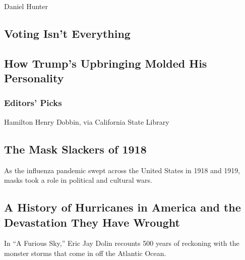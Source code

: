 \href{/2020/08/04/opinion/voting-2020-election-blm-movement.html}{}

Daniel Hunter

\hypertarget{voting-isnt-everything}{%
\subsection{Voting Isn't Everything}\label{voting-isnt-everything}}

\href{/2020/08/04/opinion/letters/trump-family.html}{}

\hypertarget{how-trumps-upbringing-molded-his-personality}{%
\subsection{How Trump's Upbringing Molded His
Personality}\label{how-trumps-upbringing-molded-his-personality}}

\hypertarget{editors-picks}{%
\subsubsection{Editors' Picks}\label{editors-picks}}

\href{/2020/08/03/us/mask-protests-1918.html}{}

Hamilton Henry Dobbin, via California State Library

\href{/2020/08/03/us/mask-protests-1918.html}{}

\hypertarget{the-mask-slackers-of-1918}{%
\subsection{The Mask Slackers of 1918}\label{the-mask-slackers-of-1918}}

As the influenza pandemic swept across the United States in 1918 and
1919, masks took a role in political and cultural wars.

\href{/2020/08/04/books/review/a-furious-sky-hurricanes-eric-jay-dolan.html}{}

\hypertarget{a-history-of-hurricanes-in-america-and-the-devastation-they-have-wrought}{%
\subsection{A History of Hurricanes in America and the Devastation They
Have
Wrought}\label{a-history-of-hurricanes-in-america-and-the-devastation-they-have-wrought}}

In ``A Furious Sky,'' Eric Jay Dolin recounts 500 years of reckoning
with the monster storms that come in off the Atlantic Ocean.


